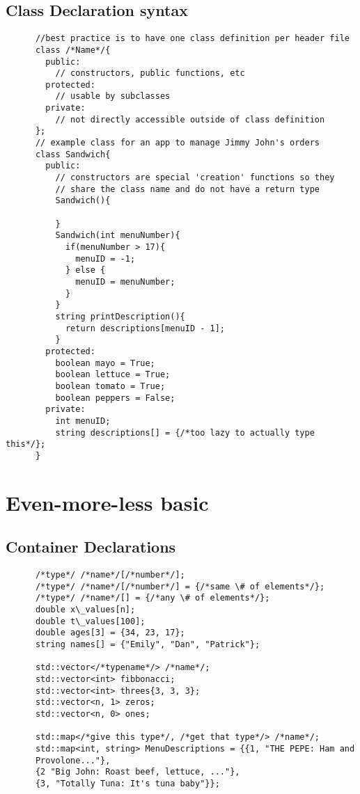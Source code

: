 \documentclass[12pt]{article}
\begin{document}
  \subsection{Class Declaration syntax}
    \begin{lstlisting}
      //best practice is to have one class definition per header file
      class /*Name*/{
        public:
          // constructors, public functions, etc
        protected:
          // usable by subclasses
        private:
          // not directly accessible outside of class definition
      };
      // example class for an app to manage Jimmy John's orders
      class Sandwich{
        public:
          // constructors are special 'creation' functions so they
          // share the class name and do not have a return type
          Sandwich(){
          
          }
          Sandwich(int menuNumber){
            if(menuNumber > 17){
              menuID = -1;
            } else {
              menuID = menuNumber;
            }
          }
          string printDescription(){
            return descriptions[menuID - 1];
          }
        protected:
          boolean mayo = True;
          boolean lettuce = True;
          boolean tomato = True;
          boolean peppers = False;
        private:
          int menuID;
          string descriptions[] = {/*too lazy to actually type this*/};
      }
    \end{lstlisting}
\section{Even-more-less basic}
  \subsection{Container Declarations}
    \begin{lstlisting}
      /*type*/ /*name*/[/*number*/];
      /*type*/ /*name*/[/*number*/] = {/*same \# of elements*/};
      /*type*/ /*name*/[] = {/*any \# of elements*/};
      double x\_values[n];
      double t\_values[100];
      double ages[3] = {34, 23, 17};
      string names[] = {"Emily", "Dan", "Patrick"};

      std::vector</*typename*/> /*name*/;
      std::vector<int> fibbonacci;
      std::vector<int> threes{3, 3, 3};
      std::vector<n, 1> zeros;
      std::vector<n, 0> ones;

      std::map</*give this type*/, /*get that type*/> /*name*/;
      std::map<int, string> MenuDescriptions = {{1, "THE PEPE: Ham and
      Provolone..."}, 
      {2 "Big John: Roast beef, lettuce, ..."}, 
      {3, "Totally Tuna: It's tuna baby"}};
    \end{lstlisting}
\end{document}
